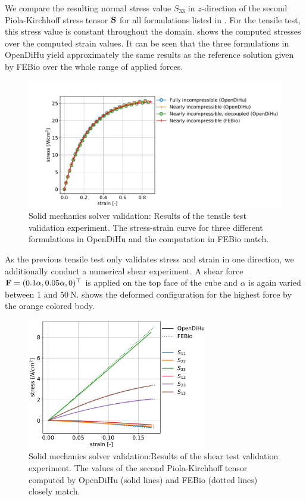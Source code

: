 We compare the resulting normal stress value $S_{33}$ in $z$-direction of the second Piola-Kirchhoff stress tensor $\textbf{S}$ for all formulations listed in . For the tensile test, this stress value is constant throughout the domain.  shows the computed stresses over the computed strain values.
It can be seen that the three formulations in OpenDiHu yield approximately the same results as the reference solution given by FEBio over the whole range of applied forces.

\begin{figure}
  \centering%
  \includegraphics[width=\textwidth]{images/results/basic/validation_tensile_test.pdf}%
  \caption{Solid mechanics solver validation: Results of the tensile test validation experiment. The stress-strain curve for three different formulations in OpenDiHu and the computation in FEBio match.}%
  \label{fig:validation_tensile_test}%
\end{figure}

As the previous tensile test only validates stress and strain in one direction, we additionally conduct a numerical shear experiment. A shear force $\textbf{F}=(0.1\alpha, 0.05\alpha, 0)^\top$ is applied on the top face of the cube and $\alpha$ is again varied between 1 and $\SI{50}{\newton}$.  shows the deformed configuration for the highest force by the orange colored body.

\begin{figure}
  \centering%
  \includegraphics[width=0.7\textwidth]{images/results/basic/validation_shear_test.pdf}%
  \caption{Solid mechanics solver validation:Results of the shear test validation experiment. The values of the second Piola-Kirchhoff tensor computed by OpenDiHu (solid lines) and FEBio (dotted lines) closely match.}%
  \label{fig:validation_shear_test}%
\end{figure}

